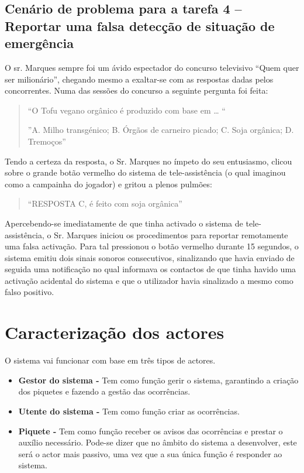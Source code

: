 \subsection{Cenário de problema para a tarefa 4 – Reportar uma falsa detecção de situação de emergência}

O sr. Marques sempre foi um ávido espectador do concurso televisivo “Quem quer ser milionário”, chegando mesmo a exaltar-se com as respostas dadas pelos concorrentes. Numa das sessões do concurso a seguinte pergunta foi feita:

\begin{quote}
	“O Tofu vegano orgânico é produzido com base em … “
	
	”A. Milho transgénico;	B. Órgãos de carneiro picado; C. Soja orgânica; D. Tremoços”
\end{quote}

Tendo a certeza da resposta, o Sr. Marques no ímpeto do seu entusiasmo, clicou sobre o grande botão vermelho do sistema de tele-assistência (o qual imaginou como a campainha do jogador) e gritou a plenos pulmões:
\begin{quote}
	“RESPOSTA C, é feito com soja orgânica”
\end{quote}

Apercebendo-se imediatamente de que tinha activado o sistema de tele-assistência, o Sr. Marques iniciou os procedimentos para reportar remotamente uma falsa activação. Para tal pressionou o botão vermelho durante 15 segundos, o sistema emitiu dois sinais sonoros consecutivos, sinalizando que havia enviado de seguida uma notificação no qual informava os contactos de que tinha havido uma activação acidental do sistema e que o utilizador havia sinalizado a mesmo como falso positivo. 

\section{Caracterização dos actores}

O sistema vai funcionar com base em três tipos de actores.

\begin{itemize}
	\item\textbf{Gestor do sistema - }Tem como função gerir o sistema, garantindo a criação dos piquetes e fazendo a gestão das ocorrências.
	
	\item\textbf{Utente do sistema - }Tem como função criar as ocorrências.
	
	\item\textbf{Piquete - }Tem como função receber os avisos das ocorrências e prestar o auxílio necessário. Pode-se dizer que no âmbito do sistema a desenvolver, este será o actor mais passivo, uma vez que a sua única função é responder ao sistema.
\end{itemize}

